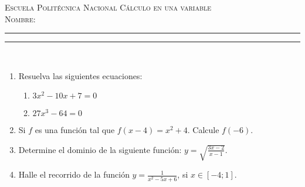\documentclass[11pt,a4paper,oneside]{article}\usepackage[]{graphicx}\usepackage[]{color}
\begin{document}
\thispagestyle{empty}
{\sf
{\Large \scshape Escuela Polit\'{e}cnica Nacional} \hfill {\scshape C\'{a}lculo en una variable}\\[7mm]
{\scshape Nombre:} \rule{0.6\textwidth}{0.5pt} \rule{0.1\textwidth}{0.5pt}\\
}











\begin{enumerate}
      \item Resuelva las siguientes ecuaciones:
\begin{enumerate}
  \item $3x^2 -10x+7=0$\\[15mm]
  \item $27x^3 -64=0$\\[15mm]
\end{enumerate}
      
      \item Si $f$ es una funci\'{o}n tal que $f(x-4)=x^2+4$. Calcule $f(-6)$.\\[25mm]
      
      \item Determine el dominio de la siguiente funci\'{o}n: $y=\sqrt{\displaystyle\frac{3x-2}{ x-1}}$.\\[45mm]
      
      \item Halle el recorrido de la funci\'{o}n $y=\displaystyle\frac{1}{x^2-5x+6}$, si $x\in [-4; 1]$.\\[40mm]
      

\end{enumerate}
\end{document}
